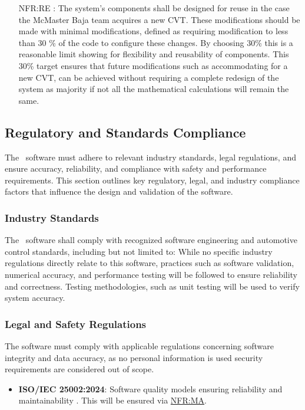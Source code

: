 \documentclass[12pt]{article}
\newcommand{\hpref}[1]{\hyperref[#1]{#1}}
\begin{document}
\begin{itemize}
\item[NFR:RE \label{NFR:RE}:]  The system's components shall be designed for reuse in the case the McMaster Baja team acquires a new CVT. 
These modifications should be made with minimal modifications, defined as requiring modification to less than 30 \% of the code to configure these changes.
By choosing 30\% this is a reasonable limit showing for flexibility and reusability of components. 
This 30\% target ensures that future modifications such as accommodating for a new CVT, can be achieved without requiring a complete redesign of the system as majority if not all the mathematical calculations will remain the same.

\end{itemize}

\subsection{Regulatory and Standards Compliance}
The \progname \ software must adhere to relevant industry standards, legal regulations, and ensure accuracy, reliability, and compliance with safety and performance requirements. 
This section outlines key regulatory, legal, and industry compliance factors that influence the design and validation of the software.

\subsubsection{Industry Standards}
The \progname \ software shall comply with recognized software engineering and automotive control standards, including but not limited to:
While no specific industry regulations directly relate to this software, practices such as software validation, numerical accuracy, and performance testing will be followed to ensure reliability and correctness. 
Testing methodologies, such as unit testing will be used to verify system accuracy.

\subsubsection{Legal and Safety Regulations}
The software must comply with applicable regulations concerning software integrity and data accuracy, as no personal information is used security requirements are considered out of scope.
\begin{itemize}
    \item \textbf{ISO/IEC 25002:2024}: Software quality models ensuring reliability and maintainability \cite{ISO26262Standard}. This will be ensured via \hpref{NFR:MA}. 
\end{itemize}
\end{document}
